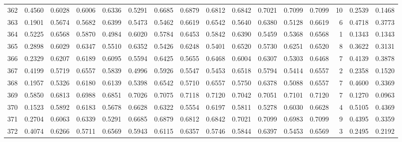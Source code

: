 \begin{tabular}{lrrrrrrrrrrrrrrr}
362 &      0.4560 &  0.6028 &  0.6006 &  0.6336 &  0.5291 &  0.6685 &  0.6879 &  0.6812 &  0.6842 &  0.7021 &   0.7099 &     0.7099 &     10 &                    0.2539 &                     0.1468 \\
363 &      0.1901 &  0.5674 &  0.5682 &  0.6399 &  0.5473 &  0.5462 &  0.6619 &  0.6542 &  0.5640 &  0.6380 &   0.5128 &     0.6619 &      6 &                    0.4718 &                     0.3773 \\
364 &      0.5225 &  0.6568 &  0.5870 &  0.4984 &  0.6020 &  0.5784 &  0.6453 &  0.5842 &  0.6390 &  0.5459 &   0.5368 &     0.6568 &      1 &                    0.1343 &                     0.1343 \\
365 &      0.2898 &  0.6029 &  0.6347 &  0.5510 &  0.6352 &  0.5426 &  0.6248 &  0.5401 &  0.6520 &  0.5730 &   0.6251 &     0.6520 &      8 &                    0.3622 &                     0.3131 \\
366 &      0.2329 &  0.6207 &  0.6189 &  0.6095 &  0.5594 &  0.6425 &  0.5655 &  0.6468 &  0.6004 &  0.6307 &   0.5303 &     0.6468 &      7 &                    0.4139 &                     0.3878 \\
367 &      0.4199 &  0.5719 &  0.6557 &  0.5839 &  0.4996 &  0.5926 &  0.5547 &  0.5453 &  0.6518 &  0.5794 &   0.5414 &     0.6557 &      2 &                    0.2358 &                     0.1520 \\
368 &      0.1957 &  0.5326 &  0.6180 &  0.6139 &  0.5398 &  0.6542 &  0.5710 &  0.6557 &  0.5750 &  0.6378 &   0.5088 &     0.6557 &      7 &                    0.4600 &                     0.3369 \\
369 &      0.5850 &  0.6813 &  0.6988 &  0.6851 &  0.7026 &  0.7075 &  0.7118 &  0.7120 &  0.7042 &  0.7051 &   0.7101 &     0.7120 &      7 &                    0.1270 &                     0.0963 \\
370 &      0.1523 &  0.5892 &  0.6183 &  0.5678 &  0.6628 &  0.6322 &  0.5554 &  0.6197 &  0.5811 &  0.5278 &   0.6030 &     0.6628 &      4 &                    0.5105 &                     0.4369 \\
371 &      0.2704 &  0.6063 &  0.6339 &  0.5291 &  0.6685 &  0.6879 &  0.6812 &  0.6842 &  0.7021 &  0.7099 &   0.6983 &     0.7099 &      9 &                    0.4395 &                     0.3359 \\
372 &      0.4074 &  0.6266 &  0.5711 &  0.6569 &  0.5943 &  0.6115 &  0.6357 &  0.5746 &  0.5844 &  0.6397 &   0.5453 &     0.6569 &      3 &                    0.2495 &                     0.2192 \\

\end{tabular}
